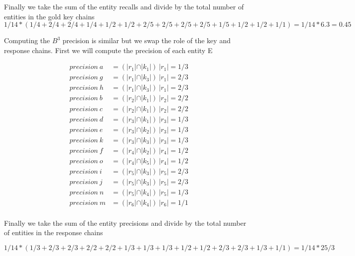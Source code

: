 \documentclass[11pt]{article}
\begin{document}
Finally we take the sum of the entity recalls and divide by the total number of entities in the gold key chains
$$ 1 / 14 * (1/4 + 2/4 + 2/4 + 1/4 + 1/2 + 1/2 + 2/5 + 2/5 + 2/5 + 2/5 + 1/5 + 1/2 + 1/2 + 1/1) = 1 / 14 * 6.3 = 0.45$$


Computing the $B^3$ precision is similar but we swap the role of the key and response chains. First we will compute the precision of each entity E

\begin{align*}
precision \ a &= (\vert r_1 \vert \cap \vert k_1 \vert) \ \vert r_1 \vert =  1 / 3\\
precision \ g &= (\vert r_1 \vert \cap \vert k_3 \vert) \ \vert r_1 \vert =  2 / 3\\
precision \ h &= (\vert r_1 \vert \cap \vert k_3 \vert) \ \vert r_1 \vert =  2 / 3\\
precision \ b &= (\vert r_2 \vert \cap \vert k_1 \vert) \ \vert r_2 \vert =  2 / 2\\
precision \ c &= (\vert r_2 \vert \cap \vert k_1 \vert) \ \vert r_2 \vert =  2 / 2\\
precision \ d &= (\vert r_3 \vert \cap \vert k_1 \vert) \ \vert r_3 \vert =  1 / 3\\
precision \ e &= (\vert r_3 \vert \cap \vert k_2 \vert) \ \vert r_3 \vert =  1 / 3\\
precision \ k &= (\vert r_3 \vert \cap \vert k_3 \vert) \ \vert r_3 \vert =  1 / 3\\
precision \ f &= (\vert r_4 \vert \cap \vert k_2 \vert) \ \vert r_4 \vert =  1 / 2\\
precision \ o &= (\vert r_4 \vert \cap \vert k_5 \vert) \ \vert r_4 \vert =  1 / 2\\
precision \ i &= (\vert r_5 \vert \cap \vert k_3 \vert) \ \vert r_5 \vert =  2 / 3\\
precision \ j &= (\vert r_5 \vert \cap \vert k_3 \vert) \ \vert r_5 \vert =  2 / 3\\
precision \ n &= (\vert r_5 \vert \cap \vert k_4 \vert) \ \vert r_5 \vert =  1 / 3\\
precision \ m &= (\vert r_6 \vert \cap \vert k_4 \vert) \ \vert r_6 \vert =  1 / 1\\	
\end{align*}

Finally we take the sum of the entity precisions and divide by the total number of entities in the response chains

$$1/14 * (1/3 + 2/3 + 2/3 + 2/2 + 2/2 + 1/3 + 1/3 + 1/3 + 1/2 + 1/2 + 2/3 + 2/3 + 1/3 + 1/1) = 1/14 * 25/3$$

\end{document}
